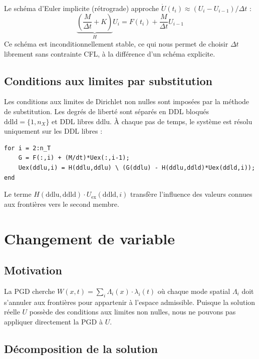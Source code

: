 \documentclass[11pt,a4paper]{article}
\begin{document}
Le schéma d'Euler implicite (rétrograde) approche
$\dot{U}(t_i) \approx (U_i - U_{i-1})/\Delta t$ :
\begin{equation}
    \underbrace{\left(\frac{M}{\Delta t} + K\right)}_{H} U_i
    = F(t_i) + \frac{M}{\Delta t}U_{i-1}
    \label{eq:euler}
\end{equation}
Ce schéma est inconditionnellement stable, ce qui nous permet de choisir $\Delta t$
librement sans contrainte CFL, à la différence d'un schéma explicite.

\subsection{Conditions aux limites par substitution}

Les conditions aux limites de Dirichlet non nulles sont imposées par la méthode de
substitution. Les degrés de liberté sont séparés en DDL bloqués
$\text{ddld} = \{1, n_X\}$ et DDL libres $\text{ddlu}$.
À chaque pas de temps, le système est résolu uniquement sur les DDL libres :
\begin{lstlisting}
for i = 2:n_T
    G = F(:,i) + (M/dt)*Uex(:,i-1);
    Uex(ddlu,i) = H(ddlu,ddlu) \ (G(ddlu) - H(ddlu,ddld)*Uex(ddld,i));
end
\end{lstlisting}
Le terme $H(\text{ddlu},\text{ddld}) \cdot U_{\text{ex}}(\text{ddld},i)$ transfère
l'influence des valeurs connues aux frontières vers le second membre.

\section{Changement de variable}

\subsection{Motivation}

La PGD cherche $W(x,t) = \sum_i \Lambda_i(x)\cdot\lambda_i(t)$ où chaque mode spatial
$\Lambda_i$ doit s'annuler aux frontières pour appartenir à l'espace admissible.
Puisque la solution réelle $U$ possède des conditions aux limites non nulles,
nous ne pouvons pas appliquer directement la PGD à $U$.

\subsection{Décomposition de la solution}
\end{document}
